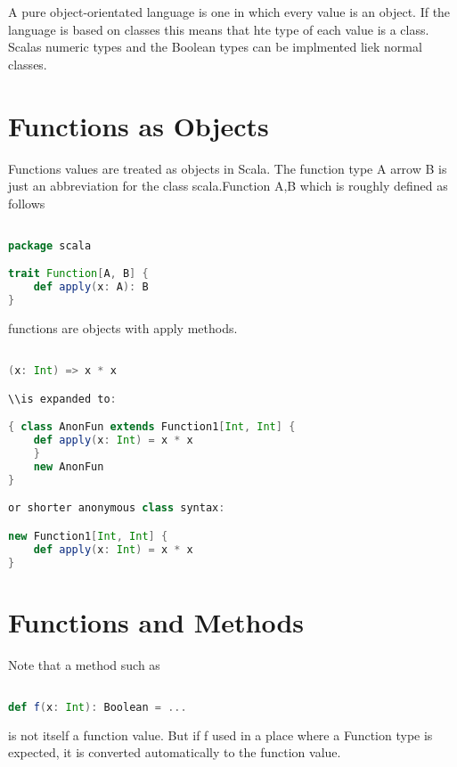\documentclass[10pt, a4paper]{report}
\begin{document}
A pure object-orientated language is one in which every value is an object. If the language is based on classes this means that hte type of each value is a class. Scalas numeric types and the Boolean types can be implmented liek normal classes.

\section{Functions as Objects}

Functions values are treated as objects in Scala. The function type A arrow B is just an abbreviation for the class scala.Function A,B which is roughly defined as follows

\begin{lstlisting}[language=scala]

package scala

trait Function[A, B] {
	def apply(x: A): B
}

\end{lstlisting}

functions are objects with apply methods. 

\begin{lstlisting}[language=scala]

(x: Int) => x * x

\\is expanded to:

{ class AnonFun extends Function1[Int, Int] {
	def apply(x: Int) = x * x
	}
	new AnonFun
}

or shorter anonymous class syntax:

new Function1[Int, Int] {
	def apply(x: Int) = x * x
}

\end{lstlisting}

\section{Functions and Methods}

Note that a method such as 

\begin{lstlisting}[language=scala]

def f(x: Int): Boolean = ...

\end{lstlisting}

is not itself a function value. But if f used in a place where a Function type is expected,  it is converted automatically to the function value.
\end{document}
